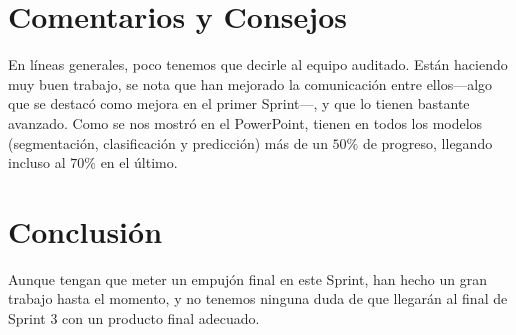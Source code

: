 \documentclass[12pt, a4paper, twoside]{article} %
\begin{document}
\section{Comentarios y Consejos}
En líneas generales, poco tenemos que decirle al equipo auditado. Están haciendo muy buen trabajo, se nota que han mejorado la comunicación entre ellos---algo que se destacó como mejora en el primer Sprint---, y que lo tienen bastante avanzado. Como se nos mostró en el PowerPoint, tienen en todos los modelos (segmentación, clasificación y predicción) más de un $50\%$ de progreso, llegando incluso al $70\%$ en el último. 

\section{Conclusión}
Aunque tengan que meter un empujón final en este Sprint, han hecho un gran trabajo hasta el momento, y no tenemos ninguna duda de que llegarán al final de Sprint 3 con un producto final adecuado. 
\end{document}
